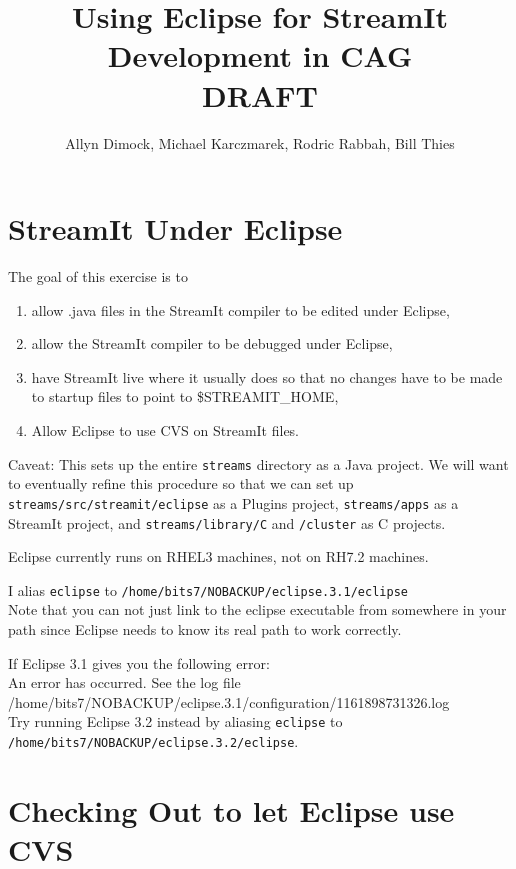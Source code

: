 \documentclass[11pt]{article}
\begin{document}
\title{Using Eclipse for StreamIt Development in CAG\\DRAFT}
\author{Allyn Dimock, Michael Karczmarek, Rodric Rabbah, Bill Thies}
\maketitle

\section{StreamIt Under Eclipse}
The goal of this exercise is to 
\begin{enumerate}
\item allow .java files in the StreamIt compiler to be edited under
  Eclipse,
\item allow the StreamIt compiler to be debugged under Eclipse,
\item have StreamIt live where it usually 
does so that no changes have to be made to startup files to point to
\$STREAMIT\_HOME,
\item Allow Eclipse to use CVS on StreamIt files.
\end{enumerate}
Caveat: This sets up the entire {\tt streams} directory as a Java project.
We will want to eventually refine this procedure so that we can set up
{\tt streams/src/streamit/eclipse} as a Plugins project, {\tt streams/apps} as a
StreamIt project, and {\tt streams/library/C} and {\tt /cluster} as C projects.

Eclipse currently runs on RHEL3 machines, not on RH7.2 machines.

I alias {\tt eclipse} to {\tt /home/bits7/NOBACKUP/eclipse.3.1/eclipse}\\
Note that you can not just link to the eclipse executable from
somewhere in your path since Eclipse needs to know its real path to
work correctly.

If Eclipse 3.1 gives you the following error:\\
An error has occurred. See the log file
/home/bits7/NOBACKUP/eclipse.3.1/configuration/1161898731326.log\\
Try running Eclipse 3.2 instead by aliasing {\tt eclipse} to {\tt /home/bits7/NOBACKUP/eclipse.3.2/eclipse}.\\

\section{Checking Out to let Eclipse use CVS}
\label{secCheckout}
\end{document}
